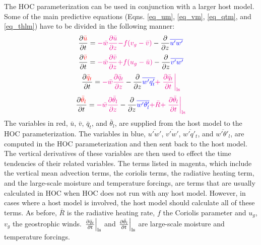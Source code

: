 \documentclass[11pt,fleqn]{article}
\newcommand{\ptlder}[2]{\frac{\partial #1}{\partial #2}}
\begin{document}
The HOC parameterization can be used in conjunction with a larger host model.
Some of the main predictive equations (Eqns. \ref{eq_um}, \ref{eq_vm},
\ref{eq_qtm}, and \ref{eq_thlm}) have to be divided in the following manner:
%
\begin{equation}
\ptlder{\color{red}\bar{u}}{t} 
= {\color{magenta}- \bar{w}\ptlder{\bar{u}}{z}}
  {\color{magenta}- f (v_g - \bar{v})}
  - \ptlder{}{z}{\color{blue}\overline{u'w'}}
\end{equation}
%
\begin{equation}
\ptlder{\color{red}\bar{v}}{t} 
= {\color{magenta}- \bar{w}\ptlder{\bar{v}}{z}}
  {\color{magenta}+ f (u_g - \bar{u})}
  - \ptlder{}{z}{\color{blue}\overline{v'w'}}
\end{equation}
%
\begin{equation}
\ptlder{\color{red}\bar{q}_t}{t}
= {\color{magenta}- \bar{w}\ptlder{\bar{q}_t}{z}}
  - \ptlder{}{z}{\color{blue}\overline{w'q'_t}}
  {\color{magenta}+ \left. \ptlder{\bar{q}_t}{t} \right|_{\rm ls}}
\end{equation}
%
\begin{equation}
\ptlder{\color{red}\bar{\theta}_l}{t} 
= {\color{magenta}- \bar{w}\ptlder{\bar{\theta}_l}{z}}
  - \ptlder{}{z}{\color{blue}\overline{w'\theta'_l}}
  {\color{magenta}+ \bar{R}}
  {\color{magenta}+ \left. \ptlder{\bar{\theta}_l}{t} \right|_{\rm ls}}
\end{equation}
%
{\color{red}The variables in red, $\bar{u}$, $\bar{v}$, $\bar{q}_t$, and
$\bar{\theta}_l$, are supplied from the host model to the HOC parameterization.}
{\color{blue}The variables in blue, $\overline{u'w'}$, $\overline{v'w'}$,
$\overline{w'q'_t}$, and $\overline{w'\theta'_l}$, are computed in the HOC
parameterization and then sent back to the host model.  The vertical
derivatives of these variables are then used to effect the time tendencies of
their related variables.}  {\color{magenta}The terms listed in magenta, which
include the vertical mean advection terms, the coriolis terms, the radiative 
heating term, and the large-scale moisture and temperature forcings, are terms 
that are usually calculated in HOC when HOC does not run with any host model.
However, in cases where a host model is involved, the host model should
calculate all of these terms.}  As before, $\bar{R}$ is the radiative heating 
rate, $f$ the Coriolis parameter and $u_g$, $v_g$ the geostrophic winds.
$\left. \ptlder{\bar{q}_t}{t} \right|_{\rm ls}$ and 
$\left. \ptlder{\bar{\theta}_l}{t} \right|_{\rm ls}$ are
large-scale moisture and temperature forcings.
\end{document}
